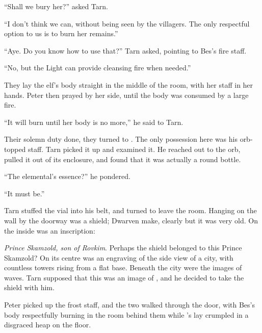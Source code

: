 ``Shall we bury her?'' asked Tarn.

``I don't think we can, without being seen by the villagers.  The only respectful option to us is to burn her remains.''

``Aye.  Do you know how to use that?'' Tarn asked, pointing to Bes's fire staff.

``No, but the Light can provide cleansing fire when needed.''

They lay the elf's body straight in the middle of the room, with her staff in her hands.  Peter then prayed by her side, until the body was consumed by a large fire.

``It will burn until her body is no more,'' he said to Tarn.


Their solemn duty done, they turned to \mothzam \driktur.  The only possession here was his orb-topped staff.  Tarn picked it up and examined it.  He reached out to the orb, pulled it out of its enclosure, and found that it was actually a round bottle.

``The elemental's essence?'' he pondered.

``It must be.''

Tarn stuffed the vial into his belt, and turned to leave the room.  Hanging on the wall by the doorway was a shield; Dwarven make, clearly but it was very old.  On the inside was an inscription:


\emph{Prince Skamzold, son of Rovkim}.  Perhaps the shield belonged to this Prince Skamzold? On its centre was an engraving of the side view of a city, with countless towers rising from a flat base.  Beneath the city were the images of waves.  Tarn supposed that this was an image of \valdunmir, and he decided to take the shield with him.

Peter picked up the frost staff, and the two walked through the door, with Bes's body respectfully burning in the room behind them while \mothzam's lay crumpled in a disgraced heap on the floor.
